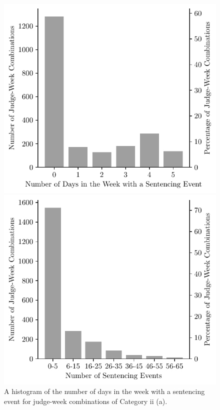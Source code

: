 \documentclass[11pt, oneside]{article}   	%
\theoremstyle{ModifiedStyle}
\begin{document}
\begin{figure}[H]
	\centering
	\begin{minipage}{.45\textwidth}
		\centering
		\hspace*{-8mm}
		\includegraphics[scale=0.75]{Figures/Histogram_of_Number_of_Days_With_Sentences_Category_10}
		\hspace{4mm}
		\vspace{-6.0mm}
		\caption{A histogram of the number of days in the week with a sentencing event for judge-week combinations of Category ii (a).}
		\label{Figure_Histogram_of_Number_of_Days_With_Sentences_Category_10}
	\end{minipage}
	\hspace{5mm}
	\begin{minipage}{0.45\textwidth}
		\centering
		\hspace*{-3mm}
		\includegraphics[scale=0.75]{Figures/Histogram_of_Sentences_This_Week_Category_10}

\end{minipage}
\end{figure}
\end{document}
